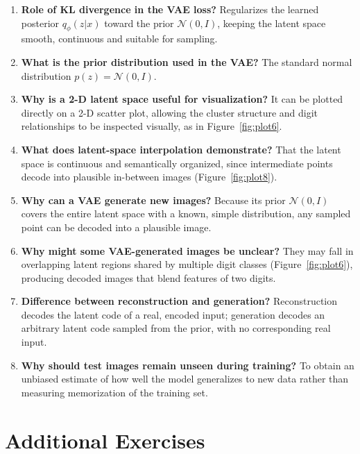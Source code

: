 \documentclass[10pt]{article}
\begin{document}
\begin{enumerate}[label=\arabic*.]
\item \textbf{Role of KL divergence in the VAE loss?} Regularizes the learned posterior $q_\phi(z|x)$
toward the prior $\mathcal{N}(0,I)$, keeping the latent space smooth, continuous and suitable for
sampling.

\item \textbf{What is the prior distribution used in the VAE?} The standard normal distribution
$p(z)=\mathcal{N}(0,I)$.

\item \textbf{Why is a 2-D latent space useful for visualization?} It can be plotted directly on a 2-D
scatter plot, allowing the cluster structure and digit relationships to be inspected visually, as in
Figure~\ref{fig:plot6}.

\item \textbf{What does latent-space interpolation demonstrate?} That the latent space is continuous and
semantically organized, since intermediate points decode into plausible in-between images (Figure~\ref{fig:plot8}).

\item \textbf{Why can a VAE generate new images?} Because its prior $\mathcal{N}(0,I)$ covers the entire
latent space with a known, simple distribution, any sampled point can be decoded into a plausible image.

\item \textbf{Why might some VAE-generated images be unclear?} They may fall in overlapping latent
regions shared by multiple digit classes (Figure~\ref{fig:plot6}), producing decoded images that blend features of two
digits.

\item \textbf{Difference between reconstruction and generation?} Reconstruction decodes the latent code
of a real, encoded input; generation decodes an arbitrary latent code sampled from the prior, with no
corresponding real input.

\item \textbf{Why should test images remain unseen during training?} To obtain an unbiased estimate of
how well the model generalizes to new data rather than measuring memorization of the training set.
\end{enumerate}

\section{Additional Exercises}
\end{document}
